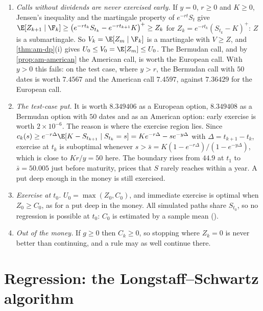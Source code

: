 \begin{remark}\label{rem:am-degenerate}
\begin{enumerate}[label=(\alph*)]
  \item \emph{Calls without dividends are never exercised early.} If $y=0$, $r\ge0$ and
    $K\ge0$, Jensen's inequality and the martingale property of $e^{-rt}S_t$ give
    $\E[Z_{k+1}\mid\F_k]\ge\big(e^{-rt_k}S_{t_k}-e^{-rt_{k+1}}K\big)^+\ge Z_k$ for
    $Z_k=e^{-rt_k}(S_{t_k}-K)^+$: $Z$ is a submartingale. So $V_k=\E[Z_m\mid\F_k]$ is a
    martingale with $V\ge Z$, and \cref{thm:am-dp}(i) gives $U_0\le V_0=\E[Z_m]\le U_0$. The
    Bermudan call, and by \cref{prop:am-american} the American call, is worth the European
    call. With $y>0$ this fails: on the test case, where $y>r$, the Bermudan call with $50$
    dates is worth $7.4567$ and the American call $7.4597$, against $7.36429$ for the
    European call.
  \item \emph{The test-case put.} It is worth $8.349406$ as a European option, $8.349408$ as a
    Bermudan option with $50$ dates and as an American option: early exercise is worth
    $2\times10^{-6}$. The reason is where the exercise region lies. Since
    $c_k(s)\ge e^{-r\Delta}\E[K-S_{t_{k+1}}\mid S_{t_k}=s]=Ke^{-r\Delta}-se^{-y\Delta}$ with
    $\Delta=t_{k+1}-t_k$, exercise at $t_k$ is suboptimal whenever
    $s>\bar s=K(1-e^{-r\Delta})/(1-e^{-y\Delta})$, which is close to $Kr/y=50$ here. The
    boundary rises from $44.9$ at $t_1$ to $\bar s=50.005$ just before maturity, prices that
    $S$ rarely reaches within a year. A put deep enough in the money is still exercised.
  \item \emph{Exercise at $t_0$.} $U_0=\max(Z_0,C_0)$, and immediate exercise is optimal
    when $Z_0\ge C_0$, as for a put deep in the money. All simulated paths share $S_{t_0}$, so
    no regression is possible at $t_0$: $C_0$ is estimated by a sample mean
    ().
  \item \emph{Out of the money.} If $g\ge0$ then $C_k\ge0$, so stopping where $Z_k=0$ is
    never better than continuing, and a rule may as well continue there.
\end{enumerate}
\end{remark}

\section{Regression: the Longstaff--Schwartz algorithm}\label{sec:am-lsm}

